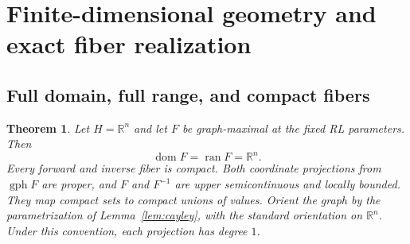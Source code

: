 \documentclass[11pt]{article}
\numberwithin{equation}{section}
\newtheorem{theorem}{Theorem}[section]
\theoremstyle{definition}
\theoremstyle{remark}
\newcommand{\R}{\mathbb R}
\newcommand{\gph}{\operatorname{gph}}
\newcommand{\dom}{\operatorname{dom}}
\newcommand{\ran}{\operatorname{ran}}
\begin{document}
\section{Finite-dimensional geometry and exact fiber realization}
\label{sec:fibers}

\subsection{Full domain, full range, and compact fibers}

\begin{theorem}\label{thm:finite_geometry}
Let $H=\R^n$ and let $F$ be graph-maximal at the fixed RL parameters.
Then
\begin{equation}\label{eq:fullrange}
 \dom F=\ran F=\R^n.
\end{equation}
Every forward and inverse fiber is compact. Both coordinate projections
from $\gph F$ are proper, and $F$ and $F^{-1}$ are upper semicontinuous
and locally bounded. They map compact sets to compact unions of values.
Orient the graph by the parametrization of Lemma~\ref{lem:cayley},
with the standard orientation on $\R^n$. Under this convention,
each projection has degree $1$.
\end{theorem}
\end{document}
